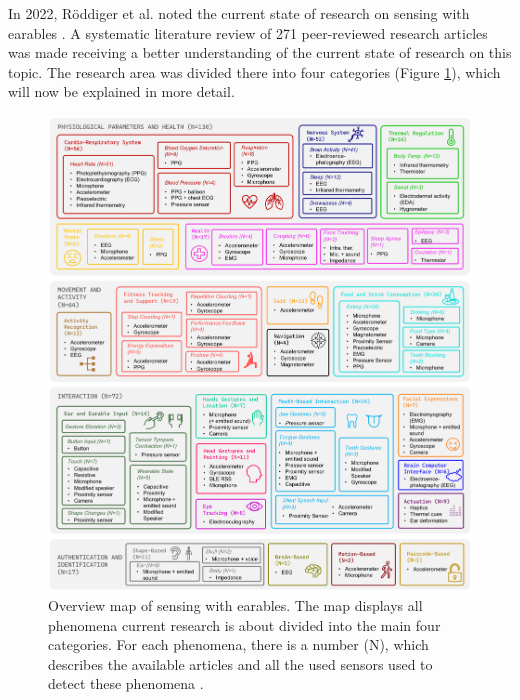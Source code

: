 In 2022, Röddiger et al. noted the current state of research on sensing with earables \cite{roddigerSensingEarablesSystematic2022a}.
A systematic literature review of 271 peer-reviewed research articles was made receiving a better understanding of the current state of research on this topic.
The research area was divided there into four categories (Figure \ref{fig:sensing_with_earables_overview}), which will now be explained in more detail.

\begin{figure}[t]
    \centering
    \includegraphics[scale=0.3525]{thesis-doc/images/sensing_with_earables_overview.png}
    \caption{Overview map of sensing with earables. The map displays all phenomena current research is about divided into the main four categories. For each phenomena, there is a number (N), which describes the available articles and all the used sensors used to detect these phenomena \cite{roddigerSensingEarablesSystematic2022a}.}
    \label{fig:sensing_with_earables_overview}
\end{figure}

